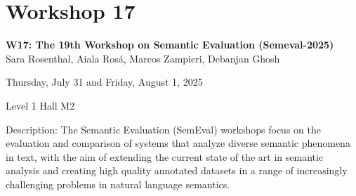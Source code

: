 \clearpage



\section[W17: The 19th Workshop on Semantic Evaluation (Semeval-2025)]{Workshop 17}
\label{workshop_17}

\begin{center}
    {\Large \textbf{W17: The 19th Workshop on Semantic Evaluation (Semeval-2025)}}\\

   Sara Rosenthal, Aiala Rosá, Marcos Zampieri, Debanjan Ghosh
    
    Thursday, July 31 and Friday, August 1, 2025
    
    Level 1 Hall M2

\end{center}

Description: The Semantic Evaluation (SemEval) workshops focus on the evaluation and comparison of systems that
analyze diverse semantic phenomena in text, with the aim of extending the current state of the art in
semantic analysis and creating high quality annotated datasets in a range of increasingly challenging
problems in natural language semantics.

